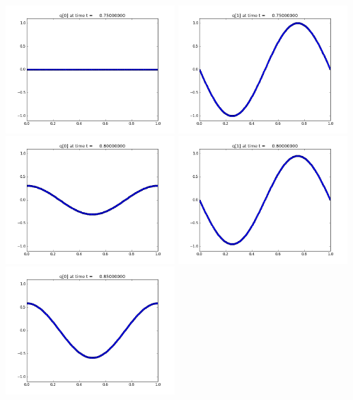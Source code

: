 \documentclass[11pt]{article}
\begin{document}
\vskip 10pt 
\includegraphics[width=0.475\textwidth]{frame0015fig0.png}
\includegraphics[width=0.475\textwidth]{frame0015fig1.png}
\vskip 10pt 
\includegraphics[width=0.475\textwidth]{frame0016fig0.png}
\includegraphics[width=0.475\textwidth]{frame0016fig1.png}
\vskip 10pt 
\includegraphics[width=0.475\textwidth]{frame0017fig0.png}
\end{document}
